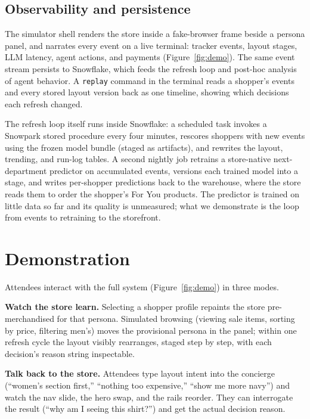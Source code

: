 \documentclass[sigconf, screen, review]{acmart}
\begin{document}
\subsection{Observability and persistence}

The simulator shell renders the store inside a fake-browser frame beside a persona panel, and narrates every event on a live terminal: tracker events, layout stages, LLM latency, agent actions, and payments (Figure~\ref{fig:demo}). The same event stream persists to Snowflake, which feeds the refresh loop and post-hoc analysis of agent behavior. A \texttt{replay} command in the terminal reads a shopper's events and every stored layout version back as one timeline, showing which decisions each refresh changed.

The refresh loop itself runs inside Snowflake: a scheduled task invokes a Snowpark stored procedure every four minutes, rescores shoppers with new events using the frozen model bundle (staged as artifacts), and rewrites the layout, trending, and run-log tables. A second nightly job retrains a store-native next-department predictor on accumulated events, versions each trained model into a stage, and writes per-shopper predictions back to the warehouse, where the store reads them to order the shopper's For You products. The predictor is trained on little data so far and its quality is unmeasured; what we demonstrate is the loop from events to retraining to the storefront.


\section{Demonstration}

Attendees interact with the full system (Figure~\ref{fig:demo}) in three modes.

\textbf{Watch the store learn.} Selecting a shopper profile repaints the store pre-merchandised for that persona. Simulated browsing (viewing sale items, sorting by price, filtering men's) moves the provisional persona in the panel; within one refresh cycle the layout visibly rearranges, staged step by step, with each decision's reason string inspectable.

\textbf{Talk back to the store.} Attendees type layout intent into the concierge (``women's section first,'' ``nothing too expensive,'' ``show me more navy'') and watch the nav slide, the hero swap, and the rails reorder. They can interrogate the result (``why am I seeing this shirt?'') and get the actual decision reason.
\end{document}
